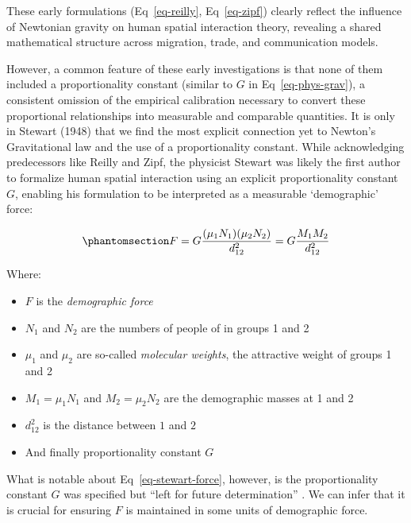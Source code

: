 \documentclass[
  10pt,
  letterpaper,
]{article}
\providecommand{\tightlist}{%
  \setlength{\itemsep}{0pt}\setlength{\parskip}{0pt}}\usepackage{longtable,booktabs,array}
\begin{document}
These early formulations (Eq~\ref{eq-reilly}, Eq~\ref{eq-zipf}) clearly
reflect the influence of Newtonian gravity on human spatial interaction
theory, revealing a shared mathematical structure across migration,
trade, and communication models.

However, a common feature of these early investigations is that none of
them included a proportionality constant (similar to \(G\) in
Eq~\ref{eq-phys-grav}), a consistent omission of the empirical
calibration necessary to convert these proportional relationships into
measurable and comparable quantities. It is only in Stewart (1948)
\citep{stewartDemographicGravitationEvidence1948} that we find the most
explicit connection yet to Newton's Gravitational law and the use of a
proportionality constant. While acknowledging predecessors like Reilly
and Zipf, the physicist Stewart was likely the first author to formalize
human spatial interaction using an explicit proportionality constant
\(G\), enabling his formulation to be interpreted as a measurable
`demographic' force:

\begin{equation}\phantomsection\label{eq-stewart-force}{
F = G\frac{(\mu_1N_1)(\mu_2N_2)}{d_{12}^2} = G\frac{M_1 M_2}{d_{12}^2} 
}\end{equation}

\noindent Where:

\begin{itemize}
\tightlist
\item
  \(F\) is the \emph{demographic force}
\item
  \(N_1\) and \(N_2\) are the numbers of people of in groups 1 and 2
\item
  \(\mu_1\) and \(\mu_2\) are so-called \emph{molecular weights}, the
  attractive weight of groups 1 and 2
\item
  \(M_1 = \mu_1N_1\) and \(M_2 = \mu_2N_2\) are the demographic masses
  at 1 and 2
\item
  \(d_{12}^2\) is the distance between \(1\) and \(2\)
\item
  And finally proportionality constant \(G\)
\end{itemize}

What is notable about Eq~\ref{eq-stewart-force}, however, is the
proportionality constant \(G\) was specified but ``left for future
determination''
\citep[p.~34]{stewartDemographicGravitationEvidence1948}. We can infer
that it is crucial for ensuring \(F\) is maintained in some units of
demographic force.
\end{document}
